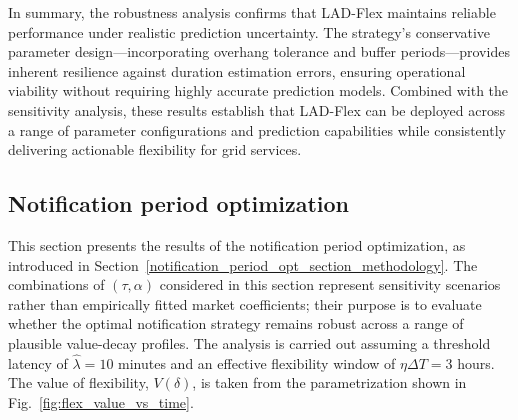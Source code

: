 \documentclass[preprint,12pt]{elsarticle}
\begin{document}
In summary, the robustness analysis confirms that LAD-Flex maintains reliable performance under realistic prediction uncertainty. The strategy's conservative parameter design—incorporating overhang tolerance and buffer periods—provides inherent resilience against duration estimation errors, ensuring operational viability without requiring highly accurate prediction models. Combined with the sensitivity analysis, these results establish that LAD-Flex can be deployed across a range of parameter configurations and prediction capabilities while consistently delivering actionable flexibility for grid services. 





























































\subsection{Notification period optimization} \label{notification_results}

This section presents the results of the notification period optimization, as introduced in Section~\ref{notification_period_opt_section_methodology}. The combinations of $(\tau, \alpha)$ considered in this section represent sensitivity scenarios rather than empirically fitted market coefficients; their purpose is to evaluate whether the optimal notification strategy remains robust across a range of plausible value-decay profiles. The analysis is carried out assuming a threshold latency of $\hat{\lambda} = 10$ minutes and an effective flexibility window of $\eta \Delta T = 3$ hours. The value of flexibility, $V(\delta)$, is taken from the parametrization shown in Fig.~\ref{fig:flex_value_vs_time}.
\end{document}
